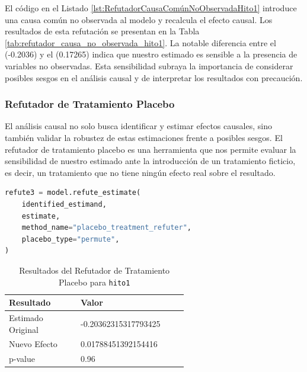 El código en el Listado \ref{lst:RefutadorCausaComúnNoObservadaHito1} introduce una causa común no observada al modelo y recalcula el efecto causal. Los resultados de esta refutación se presentan en la Tabla \ref{tab:refutador_causa_no_observada_hito1}. La notable diferencia entre el  (-0.2036) y el  (0.17265) indica que nuestro estimado es sensible a la presencia de variables no observadas. Esta sensibilidad subraya la importancia de considerar posibles sesgos en el análisis causal y de interpretar los resultados con precaución.


\subsubsection{Refutador de Tratamiento Placebo}

El análisis causal no solo busca identificar y estimar efectos causales, sino también validar la robustez de estas estimaciones frente a posibles sesgos. El refutador de tratamiento placebo es una herramienta que nos permite evaluar la sensibilidad de nuestro estimado ante la introducción de un tratamiento ficticio, es decir, un tratamiento que no tiene ningún efecto real sobre el resultado.

\begin{minipage}{0.5\textwidth}
    \begin{lstlisting}[language=Python, caption=Refutador de tratamiento placebo para \texttt{hito1}, label=lst:RefutadorTratamientoPlaceboHito1]
refute3 = model.refute_estimate(
    identified_estimand,
    estimate,
    method_name="placebo_treatment_refuter",
    placebo_type="permute",
)
\end{lstlisting}
\end{minipage}
\hfill
\begin{minipage}{0.45\textwidth}
    \begin{table}[H]
        \centering
        \begin{tabular}{lp{0.6\linewidth}}
            \toprule
            \textbf{Resultado} & \textbf{Valor} \\
            \midrule
            Estimado Original & -0.20362315317793425  \\
            Nuevo Efecto & 0.01788451392154416 \\
            p-value & 0.96 \\
            \bottomrule
        \end{tabular}
        \caption{Resultados del Refutador de Tratamiento Placebo para \texttt{hito1}}
        \label{tab:refutador_placebo_hito1}
    \end{table}
\end{minipage}

